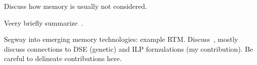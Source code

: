 Discuss how memory is usually not considered.

Veery briefly summarize~\cite{odendahl_date14,goens_jsa16,odendahl15}.

Segway into emerging memory technologies: example \ac{RTM}. Discuss~\cite{khan_date20}, mostly discuss connections to DSE (genetic) and ILP formulations (my contribution). Be careful to delineate contributions here.
